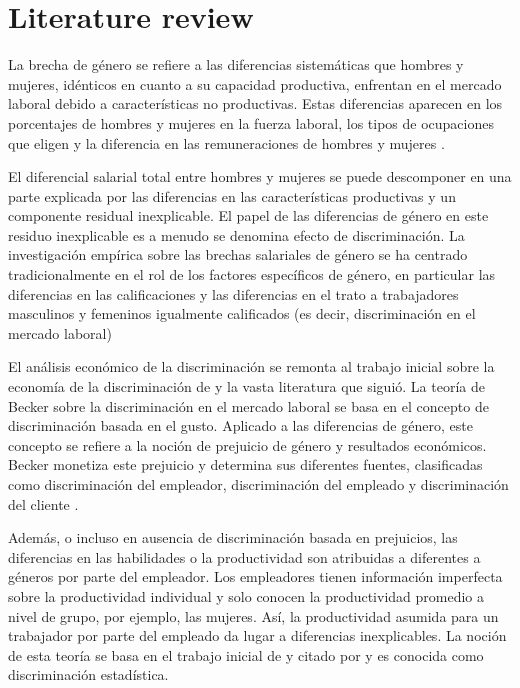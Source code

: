 \section{Literature review}

La brecha de género se refiere a las diferencias sistemáticas que hombres y mujeres, idénticos en cuanto a su capacidad productiva, enfrentan en el mercado laboral debido a características no productivas. Estas diferencias aparecen en los porcentajes de hombres y mujeres en la fuerza laboral, los tipos de ocupaciones que eligen y la diferencia en las remuneraciones de hombres y mujeres \citep{Goldin2008}.

El diferencial salarial total entre hombres y mujeres se puede descomponer en una parte explicada por las diferencias en las características productivas y un componente residual inexplicable. El papel de las diferencias de género en este residuo inexplicable es a menudo se denomina efecto de discriminación. La investigación empírica sobre las brechas salariales de género se ha centrado tradicionalmente en el rol de los factores específicos de género, en particular las diferencias en las calificaciones y las diferencias en el trato a trabajadores masculinos y femeninos igualmente calificados (es decir, discriminación en el mercado laboral) \citep{Blau1992,Weichselbaumer2005}

El análisis económico de la discriminación se remonta al trabajo inicial sobre la economía de la discriminación de \citet{Becker1985} y la vasta literatura que siguió. La teoría de Becker sobre la discriminación en el mercado laboral se basa en el concepto de discriminación basada en el gusto. Aplicado a las diferencias de género, este concepto se refiere a la noción de prejuicio de género y resultados económicos. Becker monetiza este prejuicio y determina sus diferentes fuentes, clasificadas como discriminación del empleador, discriminación del empleado y discriminación del cliente \citep{Borjas2016}.

Además, o incluso en ausencia de discriminación basada en prejuicios, las diferencias en las habilidades o la productividad son atribuidas a diferentes a géneros por parte del empleador. Los empleadores tienen información imperfecta sobre la productividad individual y solo conocen la productividad promedio a nivel de grupo, por ejemplo, las mujeres. Así, la productividad asumida para un trabajador por parte del empleado da lugar a diferencias inexplicables. La noción de esta teoría se basa en el trabajo inicial de \citet{Arrow1973} y \citet{Phelps1972} citado por \citet{Altonji1999} y es conocida como discriminación estadística.

